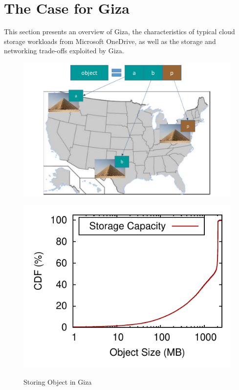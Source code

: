 \section{The Case for Giza}
\label{sec:motivation}

This section presents an overview of Giza, 
the characteristics of typical cloud storage workloads from Microsoft OneDrive,
as well as the storage and networking trade-offs exploited by Giza.


\begin{figure}[htp]
\centering
\begin{minipage}{0.3\textwidth}%
\centering
\includegraphics[width=\textwidth]{images/giza_example_crop_fit}
\caption{Storing Object in Giza}
\label{fig:giza_example}
\end{minipage}%
\begin{minipage}{0.7\textwidth}%
\captionsetup{type=figure}
\centering
		\hspace{-1.5em}
    \subcaptionbox{\label{fig:object_size-storage_capacity}}
      {\includegraphics[height=0.275\textwidth]{data/object_size-storage_capacity}}%

\end{minipage}
\end{figure}
